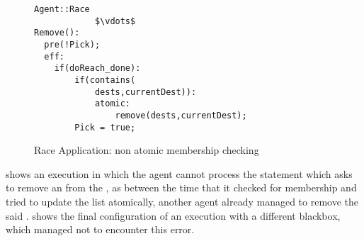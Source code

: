 \begin{figure}[ht!]
\label{fig:Race}
\noindent\begin{minipage}{.5\textwidth}

\begin{lstlisting}[mathescape = true]
Agent::Race      
			$\vdots$ 
Remove():
  pre(!Pick);
  eff:
    if(doReach_done):
    	if(contains(
    	    dests,currentDest)):
            atomic:
        		remove(dests,currentDest);
    	Pick = true;
 \end{lstlisting}
 \end{minipage}\hfill
 \caption{Race Application: non atomic membership checking}
 \end{figure}

 shows an execution in which the agent cannot process the statement which asks to remove an  from the , as between the time that it checked for membership and tried to update the list atomically, another agent already managed to remove the said .  shows the final configuration of an execution with a different blackbox, which managed not to encounter this error. 